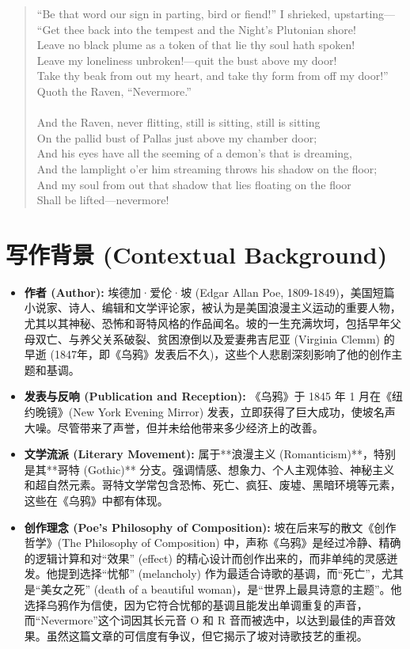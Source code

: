 \documentclass[12pt, a4paper]{article}
\begin{document}
\begin{quote}
{“Be that word our sign in parting, bird or fiend!” I shrieked, upstarting— \\
“Get thee back into the tempest and the Night's Plutonian shore! \\
Leave no black plume as a token of that lie thy soul hath spoken! \\
Leave my loneliness unbroken!—quit the bust above my door! \\
Take thy beak from out my heart, and take thy form from off my door!” \\
Quoth the Raven, “Nevermore.” \\
\\
And the Raven, never flitting, still is sitting, still is sitting \\
On the pallid bust of Pallas just above my chamber door; \\
And his eyes have all the seeming of a demon's that is dreaming, \\
And the lamplight o'er him streaming throws his shadow on the floor; \\
And my soul from out that shadow that lies floating on the floor \\
Shall be lifted—nevermore!
}
\end{quote}
\linespread{1.3} %

\section{写作背景 (Contextual Background)}

\begin{itemize}
    \item \textbf{作者 (Author):} 埃德加·爱伦·坡 (Edgar Allan Poe, 1809-1849)，美国短篇小说家、诗人、编辑和文学评论家，被认为是美国浪漫主义运动的重要人物，尤其以其神秘、恐怖和哥特风格的作品闻名。坡的一生充满坎坷，包括早年父母双亡、与养父关系破裂、贫困潦倒以及爱妻弗吉尼亚 (Virginia Clemm) 的早逝 (1847年，即《乌鸦》发表后不久)，这些个人悲剧深刻影响了他的创作主题和基调。
    \item \textbf{发表与反响 (Publication and Reception):} 《乌鸦》于 1845 年 1 月在《纽约晚镜》(New York Evening Mirror) 发表，立即获得了巨大成功，使坡名声大噪。尽管带来了声誉，但并未给他带来多少经济上的改善。
    \item \textbf{文学流派 (Literary Movement):} 属于**浪漫主义 (Romanticism)**，特别是其**哥特 (Gothic)** 分支。强调情感、想象力、个人主观体验、神秘主义和超自然元素。哥特文学常包含恐怖、死亡、疯狂、废墟、黑暗环境等元素，这些在《乌鸦》中都有体现。
    \item \textbf{创作理念 (Poe's Philosophy of Composition):} 坡在后来写的散文《创作哲学》(The Philosophy of Composition) 中，声称《乌鸦》是经过冷静、精确的逻辑计算和对“效果” (effect) 的精心设计而创作出来的，而非单纯的灵感迸发。他提到选择“忧郁” (melancholy) 作为最适合诗歌的基调，而“死亡”，尤其是“美女之死” (death of a beautiful woman)，是“世界上最具诗意的主题”。他选择乌鸦作为信使，因为它符合忧郁的基调且能发出单调重复的声音，而“Nevermore”这个词因其长元音 O 和 R 音而被选中，以达到最佳的声音效果。虽然这篇文章的可信度有争议，但它揭示了坡对诗歌技艺的重视。
\end{itemize}
\end{document}
